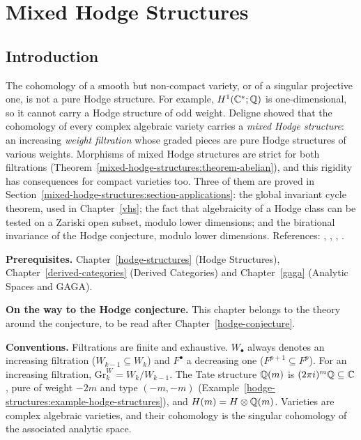 \chapter{Mixed Hodge Structures}\label{mixed-hodge-structures}

\section{Introduction}\label{mixed-hodge-structures:section-introduction}

The cohomology of a smooth but non-compact variety, or of a singular projective one, is not a pure Hodge structure. For example, $H^1(\mathbb{C}^*; \mathbb{Q})$ is one-dimensional, so it cannot carry a
Hodge structure of odd weight. Deligne showed that the cohomology of every complex algebraic variety carries a \emph{mixed Hodge structure}: an increasing \emph{weight filtration} whose graded pieces
are pure Hodge structures of various weights. Morphisms of mixed Hodge structures are strict for both filtrations (Theorem~\ref{mixed-hodge-structures:theorem-abelian}), and this rigidity has consequences
for compact varieties too. Three of them are proved in Section~\ref{mixed-hodge-structures:section-applications}: the global invariant cycle theorem, used in Chapter~\ref{vhs}; the fact that
algebraicity of a Hodge class can be tested on a Zariski open subset, modulo lower dimensions; and the birational invariance of the Hodge conjecture, modulo lower dimensions. References:
\cite{deligne-hodge-2}, \cite{deligne-hodge-3}, \cite{peters-steenbrink}, \cite[Chapter 8]{voisin-hodge-1}.

\noindent\textbf{Prerequisites.} Chapter~\ref{hodge-structures} (Hodge Structures), Chapter~\ref{derived-categories} (Derived Categories) and Chapter~\ref{gaga} (Analytic Spaces and GAGA).

\noindent\textbf{On the way to the Hodge conjecture.} This chapter belongs to the theory around the conjecture, to be read after Chapter~\ref{hodge-conjecture}.

\noindent\textbf{Conventions.} Filtrations are finite and exhaustive. $W_\bullet$ always denotes an increasing filtration ($W_{k-1} \subseteq W_k$) and $F^\bullet$ a decreasing one
($F^{p+1} \subseteq F^p$). For an increasing filtration, $\mathrm{Gr}^W_k = W_k/W_{k-1}$. The Tate structure $\mathbb{Q}(m)$ is $(2\pi i)^m\mathbb{Q} \subseteq \mathbb{C}$, pure of weight $-2m$ and type $(-m,-m)$
(Example~\ref{hodge-structures:example-hodge-structures}), and $H(m) = H \otimes \mathbb{Q}(m)$. Varieties are complex algebraic varieties, and their cohomology is the singular cohomology of the associated
analytic space.

